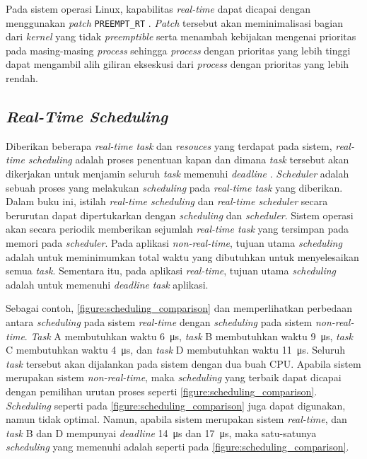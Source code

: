 Pada sistem operasi Linux, kapabilitas \textit{real-time} dapat dicapai dengan menggunakan
\textit{patch} \texttt{PREEMPT\_RT} \citep{RTLinux}. \textit{Patch} tersebut akan meminimalisasi
bagian dari \textit{kernel} yang tidak \textit{preemptible} serta menambah kebijakan mengenai
prioritas pada masing-masing \textit{process} sehingga \textit{process} dengan prioritas yang
lebih tinggi dapat mengambil alih giliran ekseskusi dari \textit{process} dengan prioritas yang
lebih rendah.

\subsection{\textit{Real-Time Scheduling}}

Diberikan beberapa \textit{real-time task} dan \textit{resouces} yang terdapat pada sistem,
\textit{real-time scheduling} adalah proses penentuan kapan dan dimana \textit{task} tersebut
akan dikerjakan untuk menjamin seluruh \textit{task} memenuhi \textit{deadline}
\citep[pp.~8-9]{Shin1994}.  \textit{Scheduler} adalah sebuah proses yang melakukan
\textit{scheduling} pada \textit{real-time task} yang diberikan.  Dalam buku ini, istilah
\textit{real-time scheduling} dan \textit{real-time scheduler} secara berurutan dapat
dipertukarkan dengan \textit{scheduling} dan \textit{scheduler}.  Sistem operasi akan secara
periodik memberikan sejumlah \textit{real-time task} yang tersimpan pada memori pada
\textit{scheduler}.  Pada aplikasi \textit{non-real-time}, tujuan utama \textit{scheduling}
adalah untuk meminimumkan total waktu yang dibutuhkan untuk menyelesaikan semua \textit{task}.
Sementara itu, pada aplikasi \textit{real-time}, tujuan utama \textit{scheduling} adalah untuk
memenuhi \textit{deadline} \textit{task} aplikasi.

Sebagai contoh, \autoref{figure:scheduling_comparison}
dan  memperlihatkan perbedaan antara
\textit{scheduling} pada sistem \textit{real-time} dengan \textit{scheduling} pada sistem
\textit{non-real-time}.  \textit{Task} A membutuhkan waktu \SI{6}{\micro\second}, \textit{task}
B membutuhkan waktu \SI{9}{\micro\second}, \textit{task} C membutuhkan waktu
\SI{4}{\micro\second}, dan \textit{task} D membutuhkan waktu \SI{11}{\micro\second}.  Seluruh
\textit{task} tersebut akan dijalankan pada sistem dengan dua buah CPU.  Apabila sistem
merupakan sistem \textit{non-real-time}, maka \textit{scheduling} yang terbaik dapat dicapai
dengan pemilihan urutan proses seperti
\autoref{figure:scheduling_comparison}.
\textit{Scheduling} seperti pada
\autoref{figure:scheduling_comparison} juga dapat
digunakan, namun tidak optimal.  Namun, apabila sistem merupakan sistem \textit{real-time}, dan
\textit{task} B dan D mempunyai \textit{deadline} \SI{14}{\micro\second} dan
\SI{17}{\micro\second}, maka satu-satunya \textit{scheduling} yang memenuhi adalah seperti pada
\autoref{figure:scheduling_comparison}.

